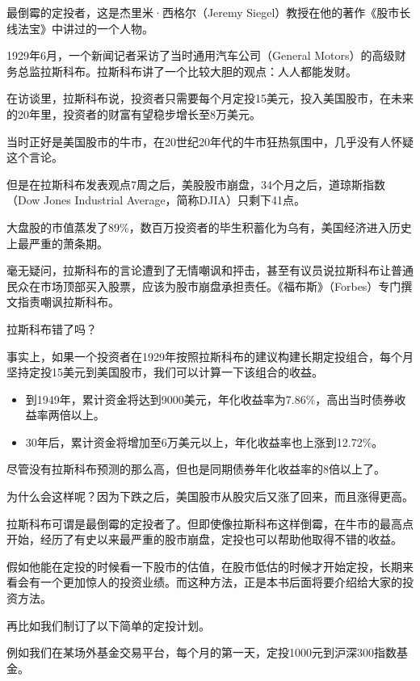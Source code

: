 最倒霉的定投者，这是杰里米·西格尔（Jeremy Siegel）教授在他的著作《股市长线法宝》中讲过的一个人物。

{\kaishu 1929年6月，一个新闻记者采访了当时通用汽车公司（General Motors）的高级财务总监拉斯科布。拉斯科布讲了一个比较大胆的观点：人人都能发财。}

{\kaishu 在访谈里，拉斯科布说，投资者只需要每个月定投15美元，投入美国股市，在未来的20年里，投资者的财富有望稳步增长至8万美元。}

{\kaishu 当时正好是美国股市的牛市，在20世纪20年代的牛市狂热氛围中，几乎没有人怀疑这个言论。}

{\kaishu 但是在拉斯科布发表观点7周之后，美股股市崩盘，34个月之后，道琼斯指数（Dow Jones Industrial Average，简称DJIA）只剩下41点。}

{\kaishu 大盘股的市值蒸发了89\%，数百万投资者的毕生积蓄化为乌有，美国经济进入历史上最严重的萧条期。}

{\kaishu 毫无疑问，拉斯科布的言论遭到了无情嘲讽和抨击，甚至有议员说拉斯科布让普通民众在市场顶部买入股票，应该为股市崩盘承担责任。《福布斯》（Forbes）专门撰文指责嘲讽拉斯科布。}

{\kaishu 拉斯科布错了吗？}

{\kaishu 事实上，如果一个投资者在1929年按照拉斯科布的建议构建长期定投组合，每个月坚持定投15美元到美国股市，我们可以计算一下该组合的收益。}

\begin{itemize}
\item {\kaishu 到1949年，累计资金将达到9000美元，年化收益率为7.86\%，高出当时债券收益率两倍以上。}
\item {\kaishu 30年后，累计资金将增加至6万美元以上，年化收益率也上涨到12.72\%。}
\end{itemize}

{\kaishu 尽管没有拉斯科布预测的那么高，但也是同期债券年化收益率的8倍以上了。}

{\kaishu 为什么会这样呢？因为下跌之后，美国股市从股灾后又涨了回来，而且涨得更高。}

拉斯科布可谓是最倒霉的定投者了。但即使像拉斯科布这样倒霉，在牛市的最高点开始，经历了有史以来最严重的股市崩盘，定投也可以帮助他取得不错的收益。

假如他能在定投的时候看一下股市的估值，在股市低估的时候才开始定投，长期来看会有一个更加惊人的投资业绩。而这种方法，正是本书后面将要介绍给大家的投资方法。

再比如我们制订了以下简单的定投计划。

{\kaishu 例如我们在某场外基金交易平台，每个月的第一天，定投1000元到沪深300指数基金。}

